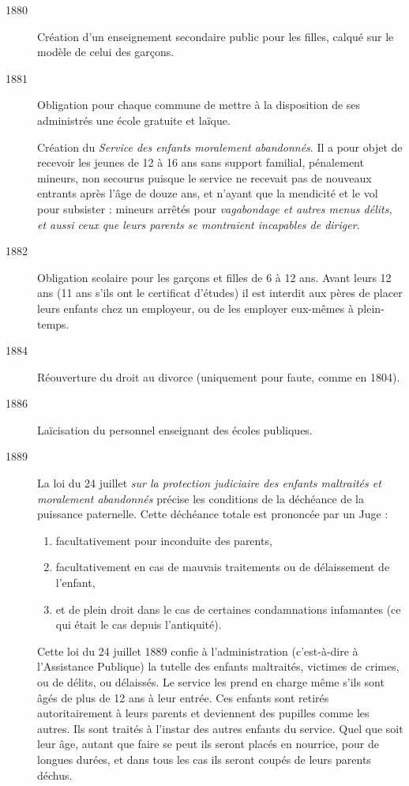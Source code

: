 \begin{description}
\item[1880] Création d'un enseignement secondaire public pour les filles, calqué sur le modèle de celui des garçons. 

\item[1881] Obligation pour chaque commune de mettre à la disposition de ses administrés une école gratuite et laïque.

Création du \emph{Service des enfants moralement abandonnés}. Il a pour objet de recevoir les jeunes de 12 à 16 ans sans support familial, pénalement mineurs, non secourus puisque le service ne recevait pas de nouveaux entrants après l'âge de douze ans, et n'ayant que la mendicité et le vol pour subsister : mineurs arrêtés pour {\emph{vagabondage et autres menus délits, et aussi ceux que leurs parents se montraient incapables de diriger}}.

\item[1882] Obligation scolaire pour les garçons et filles de 6 à 12 ans. Avant leurs 12 ans (11 ans s'ils ont le certificat d'études) il est interdit aux pères de placer leurs enfants chez un employeur, ou de les employer eux-mêmes à plein-temps.

\item[1884] Réouverture du droit au divorce (uniquement pour faute, comme en 1804).

\item[1886] Laïcisation du personnel enseignant des écoles publiques. 

\item[1889] La loi du 24 juillet {\emph{sur la protection judiciaire des enfants maltraités et moralement abandonnés}} précise les conditions de la déchéance de la puissance paternelle. Cette déchéance totale est prononcée par un Juge :
\begin{enumerate}
\item facultativement pour inconduite des parents,
\item facultativement en cas de mauvais traitements ou de délaissement de l'enfant,
\item et de plein droit dans le cas de certaines condamnations infamantes (ce qui était le cas depuis l'antiquité).
\end{enumerate}

Cette loi du 24 juillet 1889 %
confie à l'administration (c'est-à-dire à l'Assistance Publique) la tutelle des enfants maltraités, victimes de crimes, ou de délits, ou délaissés. Le service les prend en charge même s'ils sont âgés de plus de 12 ans à leur entrée. Ces enfants sont retirés autoritairement à leurs parents et deviennent des pupilles comme les autres. Ils sont traités à l'instar des autres enfants du service. Quel que soit leur âge, autant que faire se peut ils seront placés en nourrice, pour de longues durées, et dans tous les cas ils seront coupés de leurs parents déchus.


\end{description}
